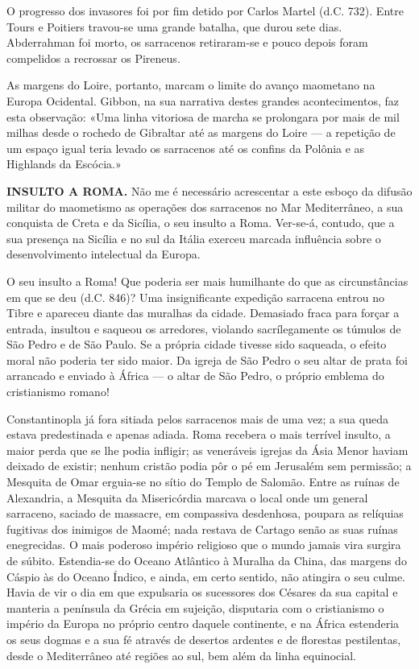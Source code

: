 \documentclass[11pt,a5paper,twoside,openany]{book}
\begin{document}
O progresso dos invasores foi por fim detido por Carlos Martel (d.C. 732). Entre Tours e Poitiers travou-se uma grande batalha, que durou sete dias. Abderrahman foi morto, os sarracenos retiraram-se e pouco depois foram compelidos a recrossar os Pireneus.

As margens do Loire, portanto, marcam o limite do avanço maometano na Europa Ocidental. Gibbon, na sua narrativa destes grandes acontecimentos, faz esta observação: «Uma linha vitoriosa de marcha se prolongara por mais de mil milhas desde o rochedo de Gibraltar até as margens do Loire — a repetição de um espaço igual teria levado os sarracenos até os confins da Polônia e as Highlands da Escócia.»

\textbf{INSULTO A ROMA.} Não me é necessário acrescentar a este esboço da difusão militar do maometismo as operações dos sarracenos no Mar Mediterrâneo, a sua conquista de Creta e da Sicília, o seu insulto a Roma. Ver-se-á, contudo, que a sua presença na Sicília e no sul da Itália exerceu marcada influência sobre o desenvolvimento intelectual da Europa.

O seu insulto a Roma! Que poderia ser mais humilhante do que as circunstâncias em que se deu (d.C. 846)? Uma insignificante expedição sarracena entrou no Tibre e apareceu diante das muralhas da cidade. Demasiado fraca para forçar a entrada, insultou e saqueou os arredores, violando sacrílegamente os túmulos de São Pedro e de São Paulo. Se a própria cidade tivesse sido saqueada, o efeito moral não poderia ter sido maior. Da igreja de São Pedro o seu altar de prata foi arrancado e enviado à África — o altar de São Pedro, o próprio emblema do cristianismo romano!

Constantinopla já fora sitiada pelos sarracenos mais de uma vez; a sua queda estava predestinada e apenas adiada. Roma recebera o mais terrível insulto, a maior perda que se lhe podia infligir; as veneráveis igrejas da Ásia Menor haviam deixado de existir; nenhum cristão podia pôr o pé em Jerusalém sem permissão; a Mesquita de Omar erguia-se no sítio do Templo de Salomão. Entre as ruínas de Alexandria, a Mesquita da Misericórdia marcava o local onde um general sarraceno, saciado de massacre, em compassiva desdenhosa, poupara as relíquias fugitivas dos inimigos de Maomé; nada restava de Cartago senão as suas ruínas enegrecidas. O mais poderoso império religioso que o mundo jamais vira surgira de súbito. Estendia-se do Oceano Atlântico à Muralha da China, das margens do Cáspio às do Oceano Índico, e ainda, em certo sentido, não atingira o seu culme. Havia de vir o dia em que expulsaria os sucessores dos Césares da sua capital e manteria a península da Grécia em sujeição, disputaria com o cristianismo o império da Europa no próprio centro daquele continente, e na África estenderia os seus dogmas e a sua fé através de desertos ardentes e de florestas pestilentas, desde o Mediterrâneo até regiões ao sul, bem além da linha equinocial.
\end{document}
